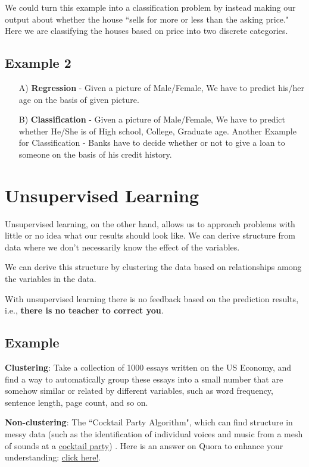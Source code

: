 We could turn this example into a classification problem by instead making our output about whether the house ``sells for more or less than the asking price." Here we are classifying the houses based on price into two discrete categories.
\subsection{Example 2}
\begin{itemize}
	\item[A)] {\bf Regression} - Given a picture of Male/Female, We have to predict his/her age on the basis of given picture.
	\item[B)] {\bf Classification}  - Given a picture of Male/Female, We have to predict whether He/She is of High school, College, Graduate age. Another Example for Classification - Banks have to decide whether or not to give a loan to someone on the basis of his credit history.
\end{itemize}
\section{Unsupervised Learning}
Unsupervised learning, on the other hand, allows us to approach problems with little or no idea what our results should look like. We can derive structure from data where we don't necessarily know the effect of the variables.

We can derive this structure by clustering the data based on relationships among the variables in the data.

With unsupervised learning there is no feedback based on the prediction results, i.e., {\bf there is no teacher to correct you}.
\subsection{Example}
{\bf Clustering}: Take a collection of 1000 essays written on the US Economy, and find a way to automatically group these essays into a small number that are somehow similar or related by different variables, such as word frequency, sentence length, page count, and so on.

{\bf Non-clustering}: The ``Cocktail Party Algorithm", which can find structure in messy data (such as the identification of individual voices and music from a mesh of sounds at a \href{https://en.wikipedia.org/wiki/Cocktail_party_effect}{cocktail party}) . Here is an answer on Quora to enhance your understanding: \href{https://www.quora.com/What-is-the-difference-between-supervised-and-unsupervised-learning-algorithms}{click here!}.

